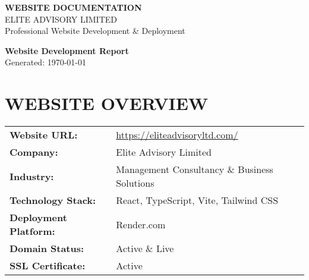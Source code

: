 \documentclass[11pt,a4paper]{article}
\begin{document}
\begin{headerbox}
    \begin{center}
        {\Huge\color{white}\textbf{WEBSITE DOCUMENTATION}} \\
        \vspace{0.3cm}
        {\Large\color{white}ELITE ADVISORY LIMITED} \\
        \vspace{0.2cm}
        {\large\color{white!80}Professional Website Development \& Deployment}
    \end{center}
\end{headerbox}

\vspace{0.5cm}

\begin{center}
    {\LARGE\color{primaryBlue}\textbf{Website Development Report}} \\
    \vspace{0.2cm}
    {\large\color{mediumGray}Generated: \today}
\end{center}

\vspace{0.8cm}

\section*{\color{primaryBlue}WEBSITE OVERVIEW}

\begin{detailsbox}
    \begin{tabularx}{\textwidth}{@{}lX@{}}
        \textbf{Website URL:} & \href{https://eliteadvisoryltd.com/}{https://eliteadvisoryltd.com/} \\
        \textbf{Company:} & Elite Advisory Limited \\
        \textbf{Industry:} & Management Consultancy \& Business Solutions \\
        \textbf{Technology Stack:} & React, TypeScript, Vite, Tailwind CSS \\
        \textbf{Deployment Platform:} & Render.com \\
        \textbf{Domain Status:} & Active \& Live \\
        \textbf{SSL Certificate:} & Active \\
    \end{tabularx}
\end{detailsbox}
\end{document}
